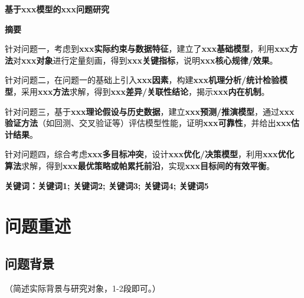 \documentclass[draft,12pt,a4paper]{ctexart}
\theoremstyle{definition}
\begin{document}
\newcommand{\keywords}[1]{\par\vspace{6pt}\noindent\textbf{关键词：#1}\par}

\renewcommand{\lstlistingname}{代码}

\begin{center}
  {\huge\bfseries 基于\textbf{xxx模型}的\textbf{xxx问题}研究\par}
\end{center}


\begin{center}
  {\bfseries \textbf{摘\quad 要}}
\end{center}
\vspace{0.1cm}

针对问题一，考虑到\textbf{xxx实际约束与数据特征}，建立了\textbf{xxx基础模型}，利用\textbf{xxx方法}对\textbf{xxx对象}进行定量刻画，得到\textbf{xxx关键指标}，说明\textbf{xxx核心规律/效果}。

针对问题二，在问题一的基础上引入\textbf{xxx因素}，构建\textbf{xxx机理分析/统计检验模型}，采用\textbf{xxx方法}求解，得到\textbf{xxx差异/关联性结论}，揭示\textbf{xxx内在机制}。

针对问题三，基于\textbf{xxx理论假设与历史数据}，建立\textbf{xxx预测/推演模型}，通过\textbf{xxx验证方法}（如回测、交叉验证等）评估模型性能，证明\textbf{xxx可靠性}，并给出\textbf{xxx估计结果}。

针对问题四，综合考虑\textbf{xxx多目标冲突}，设计\textbf{xxx优化/决策模型}，利用\textbf{xxx优化算法}求解，得到\textbf{xxx最优策略或帕累托前沿}，实现\textbf{xxx目标间的有效平衡}。

\vspace{6pt}
\keywords{关键词1; 关键词2; 关键词3; 关键词4; 关键词5}
\newpage

\section{问题重述}
\subsection{问题背景}
（简述实际背景与研究对象，1-2段即可。）
\end{document}
